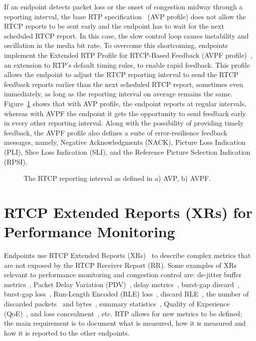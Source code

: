 
If an endpoint detects packet loss or the onset of congestion midway through a
reporting interval, the base RTP specification~\cite{rfc3550} (AVP profile)
does not allow the RTCP reports to be sent early and the endpoint has to wait for
the next scheduled RTCP report. In this case, the slow control loop causes
instability and oscillation in the media bit rate. To overcome this
shortcoming, endpoints implement the Extended RTP Profile for RTCP-Based
Feedback (AVPF profile)~\cite{rfc4585}, an extension to RTP's default timing
rules, to enable rapid feedback. This profile allows the endpoint to adjust the
RTCP reporting interval to send the RTCP feedback reports earlier than the
next scheduled RTCP report, sometimes even immediately, as long as the reporting
interval on average remains the same. Figure~\ref{fig:3:avpf.interval} shows
that with AVP profile, the endpoint reports at regular intervals, whereas with AVPF
the endpoint it gets the opportunity to send feedback early in every other reporting
interval. Along with the possibility of providing timely feedback, the AVPF
profile also defines a suite of error-resilience feedback messages, namely,
Negative Acknowledgments (NACK), Picture Loss Indication (PLI), Slice Loss
Indication (SLI), and the Reference Picture Selection Indication (RPSI).

\begin{figure}[!t]
\caption{The RTCP reporting interval as defined in a) AVP, b) AVPF.}
\label{fig:3:avpf.interval}
\end{figure}




\section{RTCP Extended Reports (XRs) for Performance Monitoring}

Endpoints use RTCP Extended Reports (XRs)~\cite{rfc3611} to describe complex
metrics that are not exposed by the RTCP Receiver Report (RR). Some examples of
XRs relevant to performance monitoring and congestion control are: de-jitter
buffer metrics~\cite{rfc7005}, Packet Delay Variation (PDV)~\cite{rfc6798},
delay metrics~\cite{rfc6843}, burst-gap discard~\cite{rfc7003}, burst-gap
loss~\cite{rfc6958}, Run-Length Encoded (RLE) loss~\cite{rfc3611}, discard
RLE~\cite{rfc7097}, the number of discarded packets~\cite{rfc7002} and
bytes~\cite{draft.xr.bytes.discarded}, summary statistics~\cite{rfc7004},
Quality of Experience (QoE)~\cite{draft.xr.qoe}, and loss
concealment~\cite{draft.xr.conceal}, etc. RTP allows for new metrics to be
defined; the main requirement is to document what is measured, how it is
measured and how it is reported to the other endpoints.


